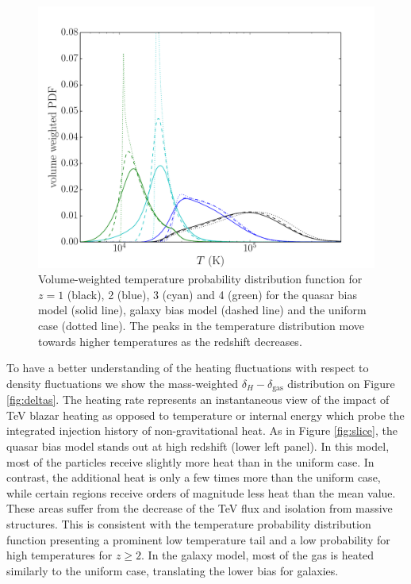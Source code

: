 \documentclass[numberedappendix]{emulateapj}
\begin{document}
\begin{figure}[h]
\centering
\includegraphics[width = .45\textwidth ]{full_PDF_256_gal_qso.pdf}
\caption{Volume-weighted temperature probability distribution function for $z=1$ (black), 2 (blue), 3 (cyan) and 4 (green) for the quasar bias model (solid line), galaxy bias model (dashed line) and the uniform case (dotted line). The peaks in the temperature distribution move towards higher temperatures as the redshift decreases.}
\label{fig:PDF}
\end{figure}
To have a better understanding of the heating fluctuations with respect to density fluctuations we show the mass-weighted $\delta_H-\delta_{\mathrm{gas}}$ distribution on Figure \ref{fig:deltas}. The heating rate represents an instantaneous view of the impact of TeV blazar heating as opposed to temperature or internal energy which probe the integrated injection history of non-gravitational heat. As in Figure \ref{fig:slice}, the quasar bias model stands out at high redshift (lower left panel).  In this model, most of the particles receive slightly more heat than in the uniform case. In contrast, the additional heat is only a few times more than the uniform case, while certain regions receive orders of magnitude less heat than the mean value. These areas suffer from the decrease of the TeV flux and isolation from massive structures. This is consistent with the temperature probability distribution function presenting a prominent low temperature tail and a low probability for high temperatures for $z\geqslant 2$. In the galaxy model, most of the gas is heated similarly to the uniform case, translating the lower bias for galaxies.
\end{document}
